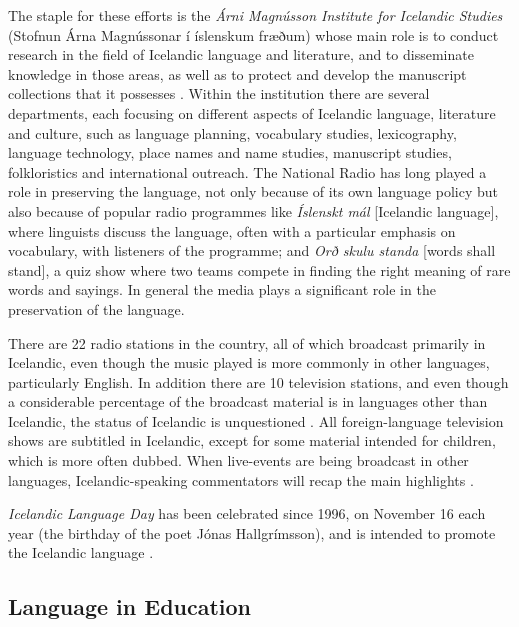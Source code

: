\documentclass{../../metanetpaper}
\begin{document}
\begin{multicols}{2}
The staple for these efforts is the \textit{Árni Magnússon Institute for Icelandic Studies} (Stofnun Árna Magnússonar í íslenskum fræðum) whose main role is to conduct research in the field of Icelandic language and literature, and to disseminate knowledge in those areas, as well as to protect and develop the manuscript collections that it possesses \cite{alt2}.  Within the institution there are several departments, each focusing on different aspects of Icelandic language, literature and culture, such as language planning, vocabulary studies, lexicography, language technology, place names and name studies, manuscript studies, folkloristics and international outreach.
The National Radio has long played a role in preserving the language, not only because of its own language policy but also because of popular radio programmes like \textit{Íslenskt mál} {[}Icelandic language{]}, where linguists discuss the language, often with a particular emphasis on vocabulary, with listeners of the programme; and \textit{Orð skulu standa} {[}words shall stand{]}, a quiz show where two teams compete in finding the right meaning of rare words and sayings. In general the media plays a significant role in the preservation of the language.

There are 22 radio stations in the country, all of which broadcast primarily in Icelandic, even though the music played is more commonly in other languages, particularly English. In addition there are 10 television stations, and even though a considerable percentage of the broadcast material is in languages other than Icelandic, the status of Icelandic is unquestioned \cite{hag2}.  All foreign-language television shows are subtitled in Icelandic, except for some material intended for children, which is more often dubbed. When live-events are being broadcast in other languages, Icelandic-speaking commentators will recap the main highlights \cite{alt3}. 

\textit{Icelandic Language Day} has been celebrated since 1996, on November 16 each year (the birthday of the poet Jónas Hallgrímsson), and is intended to promote the Icelandic language \cite{men1}.

\subsection{Language in Education}


\end{multicols}
\end{document}
